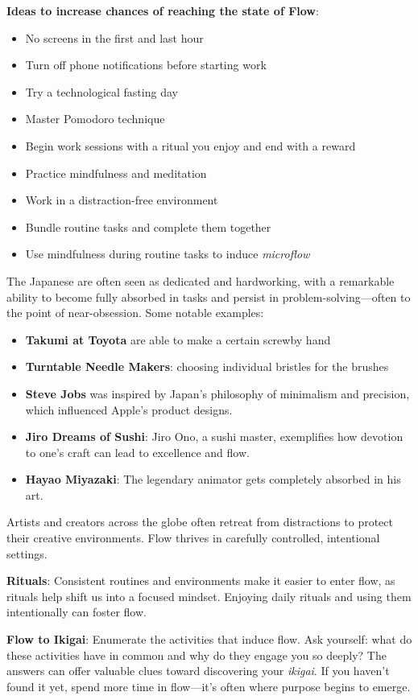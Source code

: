 \textbf{Ideas to increase chances of reaching the state of Flow}:
\begin{multicols}{2}
\begin{itemize}
    \item No screens in the first and last hour
    \item Turn off phone notifications before starting work
    \item Try a technological fasting day
    \item Master Pomodoro technique
    \item Begin work sessions with a ritual you enjoy and end with a reward
    \item Practice mindfulness and meditation
    \item Work in a distraction-free environment
    \item Bundle routine tasks and complete them together
    \item Use mindfulness during routine tasks to induce \textit{microflow}
\end{itemize}
\end{multicols}

The Japanese are often seen as dedicated and hardworking, with a remarkable ability to become fully absorbed in tasks and persist in problem-solving—often to the point of near-obsession. Some notable examples:
\begin{itemize}
    \item \textbf{Takumi at Toyota} are able to make a certain screwby hand
    \item \textbf{Turntable Needle Makers}: choosing individual bristles for the brushes
    \item \textbf{Steve Jobs} was inspired by Japan’s philosophy of minimalism and precision, which influenced Apple’s product designs.
    \item \textbf{Jiro Dreams of Sushi}: Jiro Ono, a sushi master, exemplifies how devotion to one’s craft can lead to excellence and flow.
    \item \textbf{Hayao Miyazaki}: The legendary animator gets completely absorbed in his art. 
\end{itemize}

Artists and creators across the globe often retreat from distractions to protect their creative environments. Flow thrives in carefully controlled, intentional settings.

\textbf{Rituals}: Consistent routines and environments make it easier to enter flow, as rituals help shift us into a focused mindset. Enjoying daily rituals and using them intentionally can foster flow. 

\textbf{Flow to Ikigai}: Enumerate the activities that induce flow. Ask yourself: what do these activities have in common and why do they engage you so deeply? The answers can offer valuable clues toward discovering your \textit{ikigai}. If you haven’t found it yet, spend more time in flow—it’s often where purpose begins to emerge.